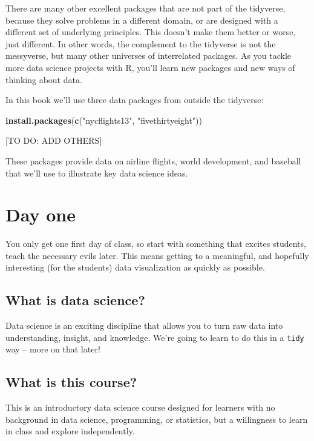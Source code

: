 \documentclass[]{book}
\newenvironment{Shaded}{\begin{snugshade}}{\end{snugshade}}
\newcommand{\KeywordTok}[1]{\textcolor[rgb]{0.13,0.29,0.53}{\textbf{#1}}}
\newcommand{\StringTok}[1]{\textcolor[rgb]{0.31,0.60,0.02}{#1}}
\newcommand{\NormalTok}[1]{#1}
\theoremstyle{definition}
\theoremstyle{definition}
\theoremstyle{definition}
\theoremstyle{remark}
\begin{document}
There are many other excellent packages that are not part of the
tidyverse, because they solve problems in a different domain, or are
designed with a different set of underlying principles. This doesn't
make them better or worse, just different. In other words, the
complement to the tidyverse is not the messyverse, but many other
universes of interrelated packages. As you tackle more data science
projects with R, you'll learn new packages and new ways of thinking
about data.

In this book we'll use three data packages from outside the tidyverse:

\begin{Shaded}
\begin{Highlighting}[]
\KeywordTok{install.packages}\NormalTok{(}\KeywordTok{c}\NormalTok{(}\StringTok{"nycflights13"}\NormalTok{, }\StringTok{"fivethirtyeight"}\NormalTok{))}
\end{Highlighting}
\end{Shaded}

{[}TO DO: ADD OTHERS{]}

These packages provide data on airline flights, world development, and
baseball that we'll use to illustrate key data science ideas.

\chapter{Day one}\label{dayone}

You only get one first day of class, so start with something that
excites students, teach the necessary evils later. This means getting to
a meaningful, and hopefully interesting (for the students) data
visualization as quickly as possible.

\section{What is data science?}\label{what-is-data-science}

Data science is an exciting discipline that allows you to turn raw data
into understanding, insight, and knowledge. We're going to learn to do
this in a \texttt{tidy} way -- more on that later!

\section{What is this course?}\label{what-is-this-course}

This is an introductory data science course designed for learners with
no background in data science, programming, or statistics, but a
willingness to learn in class and explore independently.
\end{document}
